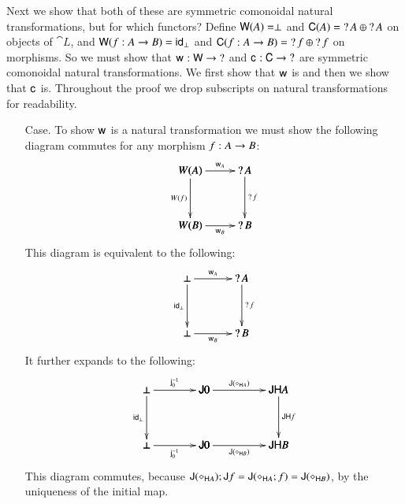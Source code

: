   Next we show that both of these are symmetric comonoidal natural
  transformations, but for which functors?  Define $\mathsf{W}(A) =
  \perp$ and $\mathsf{C}(A) = \mathop{?} A \oplus \mathop{?} A$ on objects of
  $\cat{L}$, and $\mathsf{W}(f : A \rightarrow B) = \mathsf{id}_\perp$ and $\mathsf{C}(f
  : A \rightarrow B) = \mathop{?} f \oplus \mathop{?} f$ on morphisms.  So we must show
  that $\mathsf{w}_{} : \mathsf{W} \rightarrow \mathop{?}$ and $\mathsf{c}_{} : \mathsf{C} \rightarrow \mathop{?}$ are
  symmetric comonoidal natural transformations.  We first show that
  $\mathsf{w}_{}$ is and then we show that $\mathsf{c}_{}$ is.  Throughout the proof we
  drop subscripts on natural transformations for readability.
  \begin{itemize}
  \item[Case.] To show $\mathsf{w}_{}$ is a natural transformation we must show
    the following diagram commutes for any morphism $f : A \rightarrow B$:
    \[
    \bfig
    \square[W(A)`\wn A`W(B)`\wn B;\w{A}`W(f)`\wn f`\w{B}]
    \efig
    \]
    This diagram is equivalent to the following:
    \[
    \bfig
    \square[\perp`\wn A`\perp`\wn B;\w{A}`\id_{\perp}`\wn f`\w{B}]
    \efig
    \]
    It further expands to the following:
    \[
    \bfig
    \hSquares/->`->`->``->`->`->/[\perp`\func{J}0`\func{JH}A`\perp`\func{J}0`\func{JH}B;\jinv{0}`\func{J}(\diamond_{\func{H}A})`\id_\perp``\func{JH}f`\jinv{0}`\func{J}(\diamond_{\func{H}B})]
    \efig
    \]
    This diagram commutes, because
    $\mathsf{J}(\diamond_{\mathsf{H}A});\mathsf{J}f =
    \mathsf{J}(\diamond_{\mathsf{H}A};f) =
    \mathsf{J}(\diamond_{\mathsf{H}B})$, by the uniqueness of the initial
    map.


\end{itemize}
